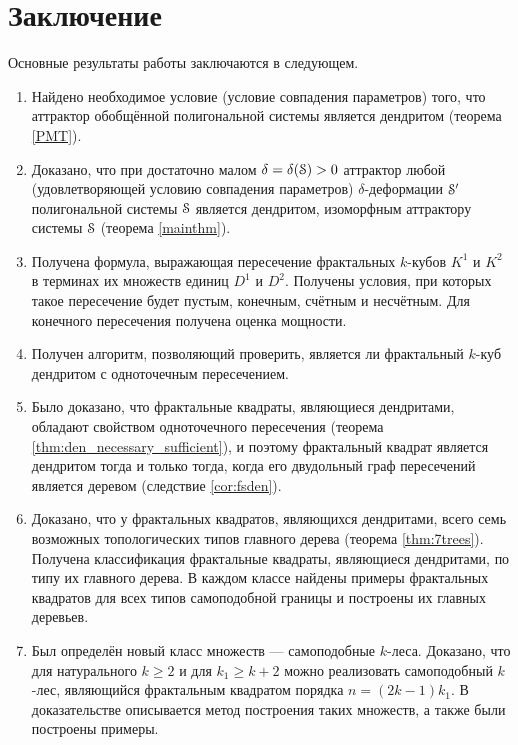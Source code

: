 \chapter*{Заключение}                       %


Основные результаты работы заключаются в следующем.

\begin{enumerate}
\item Найдено необходимое условие (условие совпадения параметров) того, что аттрактор обобщённой полигональной системы является дендритом (теорема \ref{PMT}). 

\item Доказано, что при достаточно малом $\delta=\delta({\EuScript S})>0$ аттрактор любой (удовлетворяющей условию совпадения параметров) $\delta$-деформации ${\EuScript S}'$  полигональной системы ${\EuScript S}$ является дендритом, изоморфным аттрактору системы ${\EuScript S}$ (теорема \ref{mainthm}).

\item Получена формула, выражающая пересечение фрактальных $k$-кубов $K^1$ и $K^2$ в терминах их множеств единиц $D^1$ и $D^2$.
Получены условия, при которых такое пересечение будет пустым, конечным, счётным и несчётным.
Для конечного пересечения получена оценка мощности.

\item Получен алгоритм, позволяющий проверить, является ли фрактальный $k$-куб дендритом с одноточечным пересечением.

\item Было доказано, что фрактальные квадраты, являющиеся дендритами, обладают свойством одноточечного пересечения (теорема \ref{thm:den_necessary_sufficient}), и поэтому фрактальный квадрат является дендритом тогда и только тогда, когда его двудольный граф пересечений является деревом (следствие \ref{cor:fsden}).

\item Доказано, что у фрактальных квадратов, являющихся дендритами, всего семь возможных топологических типов главного дерева (теорема \ref{thm:7trees}).
Получена классификация фрактальные квадраты, являющиеся дендритами, по типу их главного дерева.
В каждом классе найдены примеры фрактальных квадратов для всех типов самоподобной границы и построены их главных деревьев.

\item Был определён новый класс множеств --- самоподобные $k$-леса.
Доказано, что для натурального $k\geq2$ и для $ k_1\ge k+2$ можно реализовать самоподобный $k$-лес, являющийся фрактальным квадратом порядка $n=(2k-1)k_1$.
В доказательстве описывается метод построения таких множеств, а также были построены примеры.
\end{enumerate}

